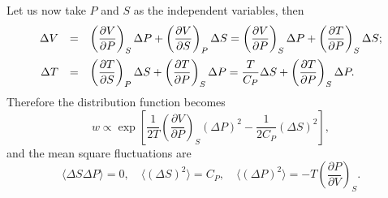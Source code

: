 \documentclass{book}
\newcommand{\average}[1]{\langle#1\rangle}
\numberwithin{equation}{section}
\begin{document}
Let us now take $P$ and $S$ as the independent variables, then
\begin{equation}
  \begin{array}{rcl}
    \Delta V&=&\displaystyle\left(\frac{\partial V}{\partial P}\right)_S
    \Delta P+\left(\frac{\partial V}{\partial S}\right)_P\Delta S=
    \left(\frac{\partial V}{\partial P}\right)_S\Delta P+
    \left(\frac{\partial T}{\partial P}\right)_S\Delta S;
    \\\vbox to 20pt{}
    \Delta T&=&\displaystyle\left(\frac{\partial T}{\partial S}\right)_P
    \Delta S+\left(\frac{\partial T}{\partial P}\right)_S\Delta P=
    \frac{T}{C_P}\Delta S+\left(\frac{\partial T}{\partial P}\right)_S
    \Delta P.
  \end{array}
\end{equation}
Therefore the distribution function becomes
\begin{equation}
  w\propto\exp\left[
    \frac{1}{2T}\left(\frac{\partial V}{\partial P}\right)_S(\Delta P)^2-
    \frac{1}{2C_P}(\Delta S)^2\right],
\end{equation}
and the mean square fluctuations are
\begin{equation}
  \average{\Delta S\Delta P}=0,\quad
  \average{(\Delta S)^2}=C_P,\quad
  \average{(\Delta P)^2}=-T\left(\frac{\partial P}{\partial V}\right)_S.
\end{equation}
\end{document}
